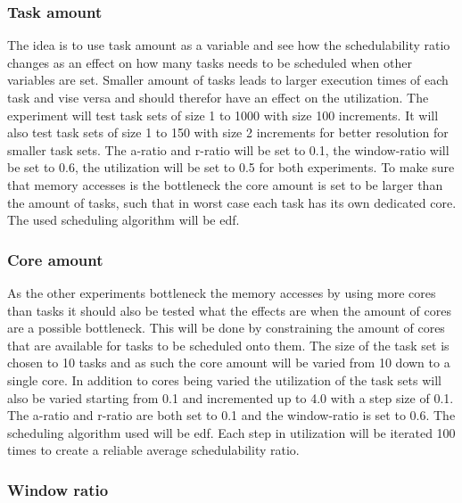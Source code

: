 \documentclass{kththesis}
\begin{document}
\subsubsection{Task amount}

The idea is to use task amount as a variable and see how the schedulability ratio changes as an
effect on how many tasks needs to be scheduled when other variables are set. Smaller amount of tasks
leads to larger execution times of each task and vise versa and should therefor have an effect on
the utilization. The experiment will test task sets of size 1 to 1000 with size 100 increments. It
will also test task sets of size 1 to 150 with size 2 increments for better resolution for smaller
task sets. The \acrshort{a}-ratio and \acrshort{r}-ratio will be set to 0.1, the window-ratio will
be set to 0.6, the utilization will be set to 0.5 for both experiments. To make sure that memory
accesses is the bottleneck the core amount is set to be larger than the amount of tasks, such that
in worst case each task has its own dedicated core. The used scheduling algorithm will be
\acrshort{edf}.

\subsubsection{Core amount}

As the other experiments bottleneck the memory accesses by using more cores than tasks it should
also be tested what the effects are when the amount of cores are a possible bottleneck. This will be
done by constraining the amount of cores that are available for tasks to be scheduled onto them. The
size of the task set is chosen to 10 tasks and as such the core amount will be varied from 10 down
to a single core. In addition to cores being varied the utilization of the task sets will also be
varied starting from 0.1 and incremented up to 4.0 with a step size of 0.1. The \acrshort{a}-ratio
and \acrshort{r}-ratio are both set to 0.1 and the window-ratio is set to 0.6. The scheduling
algorithm used will be \acrshort{edf}. Each step in utilization will be iterated 100 times to create
a reliable average schedulability ratio.


\subsubsection{Window ratio}
\end{document}
